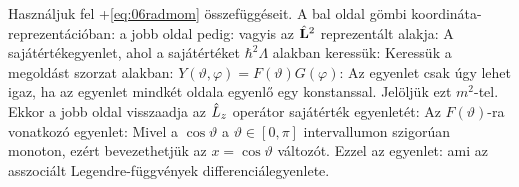     Használjuk fel \az+\eqref{eq:06radmom} összefüggéseit. A bal oldal gömbi koordináta-reprezentációban:
    a jobb oldal pedig:
    vagyis az $\hat{\mathbf{L}}^2$ reprezentált alakja:
    A sajátértékegyenlet, ahol a sajátértéket $\hbar^2\Lambda$ alakban keressük:
    Keressük a megoldást szorzat alakban: $Y(\vartheta,\varphi)=F(\vartheta)G(\varphi)$:
    Az egyenlet csak úgy lehet igaz, ha az egyenlet mindkét oldala egyenlő egy konstanssal. Jelöljük ezt $m^2$-tel. Ekkor a jobb oldal visszaadja az $\hat{L}_z$ operátor sajátérték egyenletét:
    Az $F(\vartheta)$-ra vonatkozó egyenlet:
    Mivel a $\cos\vartheta$ a $\vartheta\in[0,\pi]$ intervallumon szigorúan monoton, ezért bevezethetjük az $x=\cos\vartheta$ változót. Ezzel az egyenlet:
    ami az asszociált Legendre-függvények differenciálegyenlete.
    
